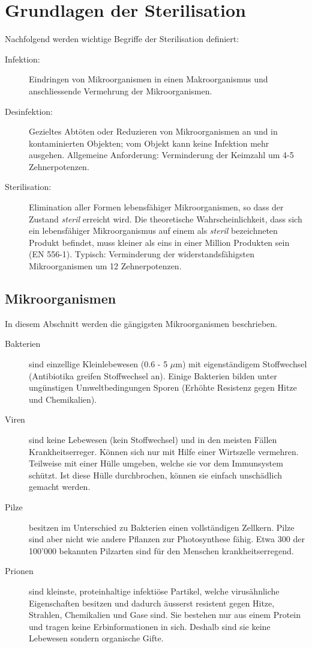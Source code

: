 \chapter{Grundlagen der Sterilisation}

Nachfolgend werden wichtige Begriffe der Sterilisation definiert:
\begin{description}
	\item[Infektion:] Eindringen von Mikroorganismen in einen Makroorganismus und anschliessende Vermehrung der Mikroorganismen.
	\item[Desinfektion:] Gezieltes Abtöten oder Reduzieren von Mikroorganismen an und in kontaminierten Objekten; vom Objekt kann keine Infektion mehr ausgehen. Allgemeine Anforderung: Verminderung der Keimzahl um 4-5 Zehnerpotenzen.
	\item[Sterilisation:] Elimination aller Formen lebensfähiger Mikroorganismen, so dass der Zustand \textit{steril} erreicht wird. Die theoretische Wahrscheinlichkeit, dass sich ein lebensfähiger Mikroorganismus auf einem als \textit{steril} bezeichneten Produkt befindet, muss kleiner als eins in einer Million Produkten sein (EN 556-1). Typisch: Verminderung der widerstandsfähigsten Mikroorganismen um 12 Zehnerpotenzen.
\end{description}

\section{Mikroorganismen}

In diesem Abschnitt werden die gängigsten Mikroorganismen beschrieben.

\begin{description}
	\item[Bakterien] sind einzellige Kleinlebewesen (0.6 - 5 $\mu$m) mit eigenständigem Stoffwechsel (Antibiotika greifen Stoffwechsel an). Einige Bakterien bilden unter ungünstigen Umweltbedingungen Sporen (Erhöhte Resistenz gegen Hitze und Chemikalien).
	\item[Viren] sind keine Lebewesen (kein Stoffwechsel) und in den meisten Fällen Krankheitserreger. Können sich nur mit Hilfe einer Wirtszelle vermehren. Teilweise mit einer Hülle umgeben, welche sie vor dem Immunsystem schützt. Ist diese Hülle durchbrochen, können sie einfach unschädlich gemacht werden.
	\item[Pilze] besitzen im Unterschied zu Bakterien einen vollständigen Zellkern. Pilze sind aber nicht wie andere Pflanzen zur Photosynthese fähig. Etwa 300 der 100'000 bekannten Pilzarten sind für den Menschen krankheitserregend.
	\item[Prionen] sind kleinste, proteinhaltige infektiöse Partikel, welche virusähnliche Eigenschaften besitzen und dadurch äusserst resistent gegen Hitze, Strahlen, Chemikalien und Gase sind. Sie bestehen nur aus einem Protein und tragen keine Erbinformationen in sich. Deshalb sind sie keine Lebewesen sondern organische Gifte. 
\end{description}

